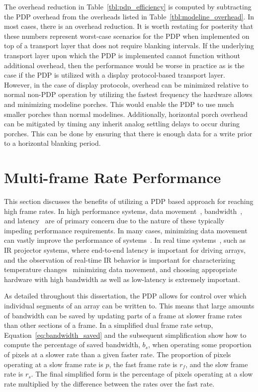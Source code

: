     The overhead reduction in Table~\ref{tbl:pdp_efficiency} is computed by subtracting the PDP overhead from the overheads listed in Table~\ref{tbl:modeline_overhead}. In most cases, there is an overhead reduction. It is worth restating for posterity that these numbers represent worst-case scenarios for the PDP when implemented on top of a transport layer that does not require blanking intervals. If the underlying transport layer upon which the PDP is implemented cannot function without additional overhead, then the performance would be worse in practice as is the case if the PDP is utilized with a display protocol-based transport layer. However, in the case of display protocols, overhead can be minimized relative to normal non-PDP operation by utilizing the fastest frequency the hardware allows and minimizing modeline porches. This would enable the PDP to use much smaller porches than normal modelines. Additionally, horizontal porch overhead can be mitigated by timing any inherit analog settling delays to occur during porches. This can be done by ensuring that there is enough data for a write prior to a horizontal blanking period.

\section{Multi-frame Rate Performance}
    \label{sec:multi_framerate_performance}

    This section discusses the benefits of utilizing a PDP based approach for reaching high frame rates. In high performance systems, data movement~\cite{LeeEtAl1984}, bandwidth~\cite{LaiBaker1999}, and latency~\cite{ZhengEtAl2014} are of primary concern due to the nature of these typically impeding performance requirements. In many cases, minimizing data movement can vastly improve the performance of systems~\cite{BandyopadhyayCoyle2004,LiEtAl2009,Hall2020}. In real time systems~\cite{Kopetz2011}, such as IR projector systems, where end-to-end latency is important for driving arrays, and the observation of real-time IR behavior is important for characterizing temperature changes~\cite{ZhouEtAl2000} minimizing data movement, and choosing appropriate hardware with high bandwidth as well as low-latency is extremely important.

    As detailed throughout this dissertation, the PDP allows for control over which individual segments of an array can be written to. This means that large amounts of bandwidth can be saved by updating parts of a frame at slower frame rates than other sections of a frame. In a simplified dual frame rate setup, Equation~\eqref{eq:bandwidth_saved} and the subsequent simplification show how to compute the percentage of saved bandwidth, $b_s$, when operating some proportion of pixels at a slower rate than a given faster rate. The proportion of pixels operating at a slow frame rate is $p$, the fast frame rate is $r_f$, and the slow frame rate is $r_s$. The final simplified form is the percentage of pixels operating at a slow rate multiplied by the difference between the rates over the fast rate.

